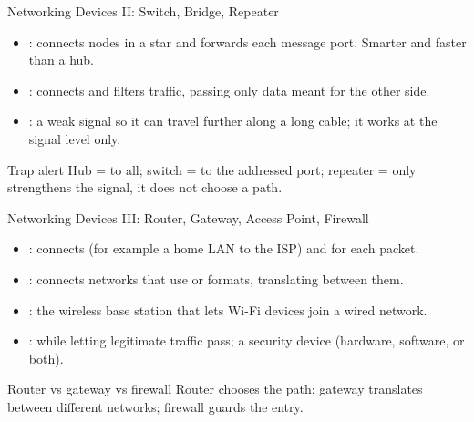 \documentclass[aspectratio=169]{beamer}
\begin{document}
\begin{frame}{Networking Devices II: Switch, Bridge, Repeater}
  \begin{itemize}
    \item {}: connects nodes in a star and forwards each message
       port. Smarter and faster than a hub.
    \item {}: connects  and filters traffic,
      passing only data meant for the other side.
    \item {}:  a weak signal so it can travel
      further along a long cable; it works at the signal level only.
  \end{itemize}
  \begin{alertblock}{Trap alert}
    Hub = to all; switch = to the addressed port; repeater = only strengthens
    the signal, it does not choose a path.
  \end{alertblock}
\end{frame}

\begin{frame}{Networking Devices III: Router, Gateway, Access Point, Firewall}
  \begin{itemize}
    \item {}: connects  (for example a home
      LAN to the ISP) and  for each packet.
    \item {}: connects networks that use 
      or formats, translating between them.
    \item {}: the wireless base station that lets Wi-Fi
      devices join a wired network.
    \item {}:  while letting
      legitimate traffic pass; a security device (hardware, software, or
      both).
  \end{itemize}
  \begin{block}{Router vs gateway vs firewall}
    Router chooses the path; gateway translates between different networks;
    firewall guards the entry.
  \end{block}
\end{frame}
\end{document}
